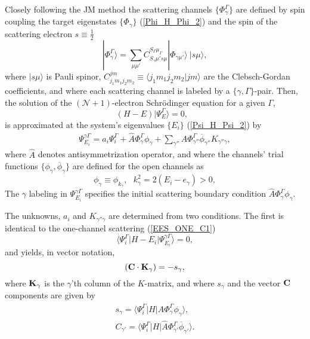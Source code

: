 \documentclass[aip
, pra
, showpacs
, aps
, twocolumn
, groupedaddress
, floatfix
]{revtex4}
\newcommand{\beq}{\begin{equation}}
\newcommand{\eeq}{\end{equation}}
\newcommand{\barr}{\begin{array}}
\newcommand{\earr}{\end{array}}
\begin{document}
Closely following the JM method \cite{BR76p1491, KFB11} the scattering channels $\{\Phi_\gamma^\Gamma\}$ are defined by spin coupling the target eigenstates
$\{\Phi_\gamma\}$ (\ref{Phi_H_Phi_2})
and the spin of the scattering electron
$s\equiv \frac{1}{2}$
\beq
| \Phi_{\gamma}^{\Gamma} \rangle = \sum_{\mu \mu'}
C_{S_\gamma \mu' s \mu}^{S_\Gamma \mu_\Gamma}
|\Phi_{\gamma \mu'} \rangle \ |s \mu  \rangle,
\label{chi_phi_Gamma} \eeq
where $|s \mu \rangle$ is Pauli spinor,
$C_{j_1m_1j_2m_2}^{jm} \equiv \langle j_1m_1 j_2 m_2| jm\rangle$ are the Clebsch-Gordan coefficients,
and where each scattering channel is labeled by a $\{\gamma, \Gamma\}$-pair.
Then, the solution of the $(\mathcal{N}+1)$-electron Schr\"odinger equation for a given $\Gamma$,
\beq
(H-E) | \Psi^\Gamma_E \rangle =0,  \ \ \  \label{H_E_Psi_E_2}
\eeq
is approximated at the system's eigenvalues $\{E_i\}$ (\ref{Psi_H_Psi_2}) by
\beq \barr{l}
 \Psi_{E_i}^{\gamma \Gamma}  =  a_i \Psi_i^{\Gamma}
 + \hat{A} \Phi^\Gamma_{\gamma}  \phi_{\gamma}
+ \sum_{\gamma''}  \hat{A} \Phi^\Gamma_{\gamma''}   \overline{\phi}_{\gamma''}  K_{\gamma'' \gamma},
\earr \label{Psi_} \eeq
where $\hat{A}$ denotes antisymmetrization operator,
and where the channels' trial functions $\{ \phi_\gamma, \overline{\phi}_\gamma \}$ are defined for the open channels as
\beq
\phi_{\gamma}\equiv \phi_{k_\gamma}, \ \ \   k_{\gamma}^2 = 2(E_i - e_\gamma) > 0,
\eeq
The $\gamma$ labeling in $\Psi_{E_i}^{\gamma \Gamma}$ specifies the initial scattering boundary condition $\hat{A} \Phi^\Gamma_{\gamma}  \phi_{\gamma}$.


The unknowns, $a_i$ and $K_{\gamma'' \gamma}$ are determined from two conditions. The first is identical to the one-channel scattering (\ref{EES_ONE_C1})
\beq
\langle\Psi_i^\Gamma|H-E_i|\Psi_{E_i}^{\gamma \Gamma}\rangle=0,
\label{EES_MC_C1} \eeq  %
and yields, in vector notation,
\beq
({\bf C} \cdot {\bf K}_\gamma) = -s_\gamma, \label{CK_s}
\eeq
where ${\bf K}_\gamma$ is the $\gamma$'th column of the $K$-matrix, and where $s_\gamma$ and the vector ${\bf C}$ components are given by
\beq \barr{l}
s_\gamma = \langle \Psi_i^\Gamma |H| \hat{A} \Phi^\Gamma_{\gamma} \phi_{\gamma} \rangle,\\
C_{\gamma'} =  \langle \Psi_i^\Gamma |H | \hat{A} \Phi^\Gamma_{\gamma'} \overline{\phi}_{\gamma'} \rangle.
\earr \label{Psi_} \eeq
\end{document}
